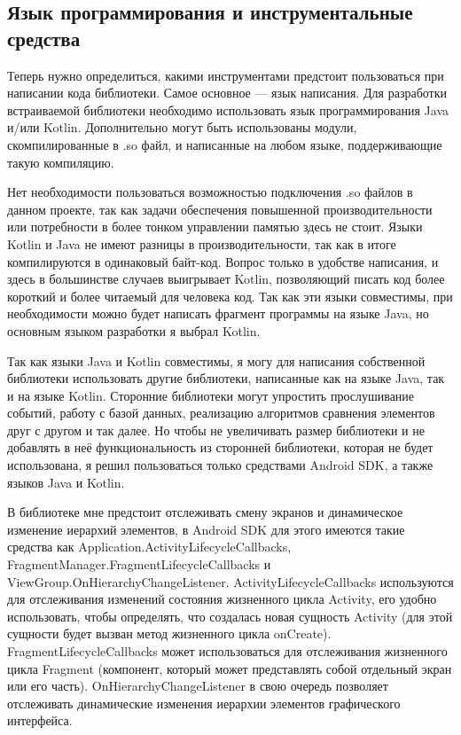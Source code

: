 \documentclass[a4paper,14pt]{extarticle} %
\begin{document}
	\subsection{Язык программирования и  инструментальные средства}
	
	Теперь нужно определиться, какими инструментами предстоит пользоваться при написании кода библиотеки. Самое основное --- язык написания. Для разработки встраиваемой библиотеки необходимо использовать язык программирования Java и/или Kotlin. Дополнительно могут быть использованы модули, скомпилированные в .so файл, и написанные на любом языке, поддерживающие такую компиляцию. 
	
	Нет необходимости пользоваться возможностью подключения .so файлов в данном проекте, так как задачи обеспечения повышенной производительности или потребности в более тонком управлении памятью здесь не стоит. Языки Kotlin и Java не имеют разницы в производительности, так как в итоге компилируются в одинаковый байт-код. Вопрос только в удобстве написания, и здесь в большинстве случаев выигрывает Kotlin, позволяющий писать код более короткий и более читаемый для человека код. Так как эти языки совместимы, при необходимости можно будет написать фрагмент программы на языке Java, но основным языком разработки я выбрал Kotlin.
	
	Так как языки Java и Kotlin совместимы, я могу для написания собственной библиотеки использовать другие библиотеки, написанные как на языке Java, так и на языке Kotlin. Сторонние библиотеки могут упростить прослушивание событий, работу с базой данных, реализацию алгоритмов сравнения элементов друг с другом и так далее. Но чтобы не увеличивать размер библиотеки и не добавлять в неё функциональность из сторонней библиотеки, которая не будет использована, я решил пользоваться только средствами Android SDK, а также языков Java и Kotlin.
	
	В библиотеке мне предстоит отслеживать смену экранов и динамическое изменение иерархий элементов, в Android SDK для этого имеются такие средства как Application.ActivityLifecycleCallbacks, FragmentManager.FragmentLifecycleCallbacks и ViewGroup.OnHierarchyChangeListener. ActivityLifecycleCallbacks используются для отслеживания изменений состояния жизненного цикла Activity, его удобно использовать, чтобы определять, что создалась новая сущность Activity (для этой сущности будет вызван метод жизненного цикла onCreate). FragmentLifecycleCallbacks может использоваться для отслеживания жизненного цикла Fragment (компонент, который может представлять собой отдельный экран или его часть). OnHierarchyChangeListener в свою очередь позволяет отслеживать динамические изменения иерархии элементов графического интерфейса.
	
\end{document}
